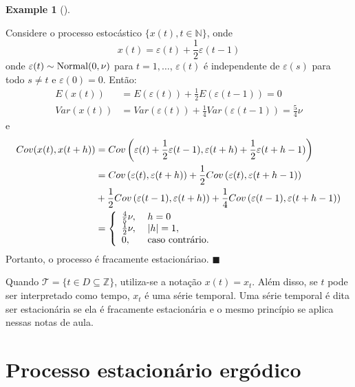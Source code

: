 \documentclass[
  letterpaper,
  DIV=11,
  numbers=noendperiod]{scrreprt}
\theoremstyle{plain}
\theoremstyle{definition}
\theoremstyle{definition}
\newtheorem{example}{Example}[chapter]
\theoremstyle{remark}
\begin{document}
\begin{example}[]\protect\hypertarget{exm-fracamente1}{}\label{exm-fracamente1}

Considere o processo estocástico \(\{x(t),t\in\mathbb{N}\}\), onde
\[x(t) = \varepsilon(t) +\frac{1}{2}\varepsilon(t-1)
\] onde \(\varepsilon(t)\sim\hbox{Normal}(0,\nu)\) para \(t=1,\ldots\),
\(\varepsilon(t)\) é independente de \(\varepsilon(s)\) para todo
\(s\neq t\) e \(\varepsilon(0)=0\). Então: \[\begin{align}
E(x(t))&=E(\varepsilon(t))+\frac{1}{2}E(\varepsilon(t-1))=0\\
Var(x(t))&=Var(\varepsilon(t))+\frac{1}{4}Var(\varepsilon(t-1))=\frac{5}{4}\nu
\end{align}
\] e \[\begin{align}
          Cov(x(t),x(t+h))&=Cov\left(\varepsilon(t)+\frac{1}{2}\varepsilon(t-1),\varepsilon(t+h)+\frac{1}{2}\varepsilon(t+h-1)\right)\\
          &=Cov\left(\varepsilon(t),\varepsilon(t+h)\right)+\frac{1}{2}Cov\left(\varepsilon(t),\varepsilon(t+h-1)\right)\\
          &+\frac{1}{2}Cov\left(\varepsilon(t-1),\varepsilon(t+h)\right)+\frac{1}{4}Cov\left(\varepsilon(t-1),\varepsilon(t+h-1)\right)\\
          &=\left\{ \begin{array}{ll}
          \frac{4}{5}\nu,&\; h = 0 \\         
          \frac{1}{2}\nu,&\; |h|=1,\\
          0,&\;\hbox{caso contrário.}
          \end{array} \right.
    \end{align}\] Portanto, o processo é fracamente estacionáriao.
\(\blacksquare\)

\end{example}

Quando \(\mathcal{T}=\{t\in D\subseteq \mathbb{Z}\}\), utiliza-se a
notação \(x(t)=x_t\). Além disso, se \(t\) pode ser interpretado como
tempo, \(x_t\) é uma série temporal. Uma série temporal é dita ser
estacionária se ela é fracamente estacionária e o mesmo princípio se
aplica nessas notas de aula.

\hypertarget{processo-estacionuxe1rio-erguxf3dico}{%
\section{Processo estacionário
ergódico}\label{processo-estacionuxe1rio-erguxf3dico}}
\end{document}
